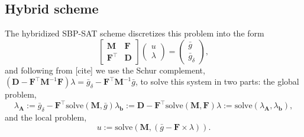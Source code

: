 \subsection{Hybrid scheme}

The hybridized SBP-SAT scheme discretizes this problem into the form 
\begin{equation}
    \left[\begin{array}{cc}
        \textbf{M}             & \textbf{F} \\
        \textbf{F}^{\intercal} & \textbf{D}
    \end{array}\right] 
    \left(\begin{array}{c}
        u \\
        \lambda
    \end{array}\right) = 
    \left(\begin{array}{c}
        \bar{g} \\
        \bar{g}_\delta
    \end{array}\right),
\end{equation}
\noindent
and following from {\color{red} [cite]} we use the Schur complement, $
(\textbf{D} - \textbf{F}^{\intercal} \textbf{M}^{-1} \textbf{F}) \lambda 
= \bar{g}_\delta - \textbf{F}^{\intercal} \textbf{M}^{-1} \bar{g}$, to 
solve this system in two parts: the global problem,
\begin{subequations}
\begin{equation}
\lambda_{\textbf{A}} := \bar{g}_\delta - \textbf{F}^{\intercal} \text{solve}(\textbf{M}, \bar{g})
\end{equation}
\begin{equation}
\lambda_{\textbf{b}} := \textbf{D} - \textbf{F}^{\intercal} \text{solve}(\textbf{M}, \textbf{F})
\end{equation}
\begin{equation}
\lambda := \text{solve}(\lambda_{\textbf{A}}, \lambda_{\textbf{b}}),
\end{equation}
\end{subequations}
\noindent
and the local problem,
\begin{equation} 
u := \text{solve}(\textbf{M}, (\bar{g} - \textbf{F} \times \lambda)).
\end{equation}

